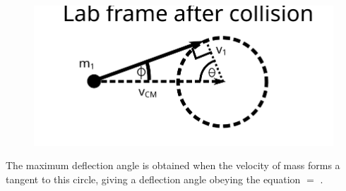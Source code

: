 \begin{problem}
{\begin{figure}[h]
\centering
\includegraphics[width=1.0\textwidth]{../../../figures/dynamics_lab_frame_deflection.svg}
\caption{}\label{fig:dynamics_lab_frame_deflection}
\end{figure}

 The maximum deflection angle is obtained when the velocity of mass  forms a tangent to this circle, giving a deflection angle \vari{\phi} obeying the equation \vari{\sin{\phi}} $=$ .  
}
\end{problem}

